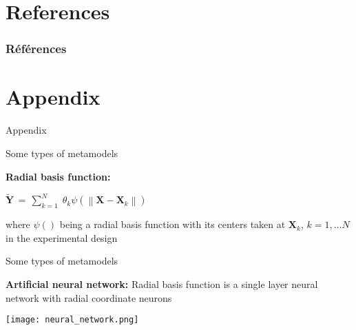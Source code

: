 \documentclass{beamer}
\begin{document}

\section{References}
\begin{frame}[allowframebreaks]
\frametitle{Références}
\nocite{*}


\end{frame}


\section{Appendix}
\begin{frame}
\begin{center}
Appendix
\end{center}
\end{frame}


\begin{frame}[t]{Some types of metamodels}

{\bf Radial basis function:}
\begin{center}
$\displaystyle{ \tilde{\boldsymbol{Y}} }\,  = \, 
\sum_{k = 1}^{N}  \; \theta_{k} \psi( \left\lVert \boldsymbol{X} - \boldsymbol{X}_k \right\rVert)   $
\end{center}
where $\psi()$ being a radial basis function with its centers taken at $\boldsymbol{X}_k$, $k = 1, \dots N$ in the experimental design

\end{frame}


\begin{frame}[t]{Some types of metamodels}

{\bf Artificial neural network:}
Radial basis function is a single layer neural network with radial coordinate neurons
\begin{center}
 \texttt{[image: neural\_network.png]}
\end{center}

\end{frame}

\end{document}

